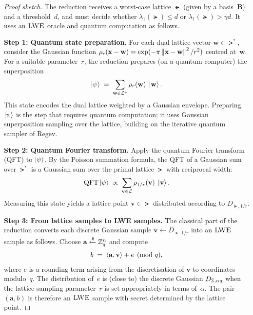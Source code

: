 \begin{proof}[Proof sketch]
The reduction receives a worst-case lattice $\lat$ (given by a
basis~$\mathbf{B}$) and a threshold~$d$, and must decide
whether $\lambda_1(\lat) \leq d$ or
$\lambda_1(\lat) > \gamma d$.  It uses an $\textsc{LWE}$ oracle and
quantum computation as follows.

\medskip\noindent\textbf{Step 1: Quantum state preparation.}
For each dual lattice vector
$\mathbf{w} \in \lat^*$, consider the Gaussian function
$\rho_r(\mathbf{x} - \mathbf{w}) = \exp(-\pi\left\lVert \mathbf{x} -
\mathbf{w} \right\rVert^2 / r^2)$ centred at~$\mathbf{w}$.  For a suitable
parameter~$r$, the reduction prepares (on a quantum computer) the
superposition
\begin{equation}
\ket{\psi} \;=\; \sum_{\mathbf{w} \in \mathcal{L}^*}
  \rho_r(\mathbf{w})\;\ket{\mathbf{w}}.
\end{equation}
This state encodes the dual lattice weighted by a Gaussian
envelope.  Preparing $\ket{\psi}$ is the step that requires
quantum computation; it uses Gaussian superposition sampling
over the lattice, building on the iterative quantum sampler of
Regev.

\medskip\noindent\textbf{Step 2: Quantum Fourier transform.}
Apply the quantum Fourier transform (QFT) to $\ket{\psi}$.
By the Poisson summation formula, the QFT of a Gaussian sum
over $\lat^*$ is a Gaussian sum over the primal lattice $\lat$
with reciprocal width:
\begin{equation}
\mathrm{QFT}\ket{\psi} \;\propto\;
  \sum_{\mathbf{v} \in \mathcal{L}}
  \rho_{1/r}(\mathbf{v})\;\ket{\mathbf{v}}.
\end{equation}
Measuring this state yields a lattice point
$\mathbf{v} \in \lat$ distributed according to
$D_{\lat, 1/r}$.

\medskip\noindent\textbf{Step 3: From lattice samples to LWE
samples.}
The classical part of the reduction converts each discrete
Gaussian sample $\mathbf{v} \leftarrow D_{\lat, 1/r}$ into an
$\textsc{LWE}$ sample as follows.  Choose
$\mathbf{a} \getsr \Zq^n$ and compute
\begin{equation}
b \;=\; \left\langle \mathbf{a}, \mathbf{v} \right\rangle + e \pmod{q},
\end{equation}
where $e$ is a rounding term arising from the discretisation
of $\mathbf{v}$ to coordinates modulo~$q$.  The distribution
of~$e$ is (close to) the discrete Gaussian $D_{\mathbb{Z}, \alpha q}$
when the lattice sampling parameter~$r$ is set appropriately
in terms of~$\alpha$.  The pair $(\mathbf{a}, b)$ is therefore
an $\textsc{LWE}$ sample with secret determined by the lattice point.


\end{proof}
